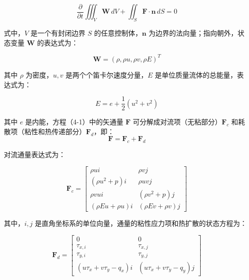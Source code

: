 \begin{equation}
\frac{\partial}{\partial t} \iiint_V \mathbf{W} \, dV + \iint_S \mathbf{F} \cdot \mathbf{n} \, dS = 0 
\end{equation}

式中，\(V\) 是一个有封闭边界 \(S\) 的任意控制体，\(\mathbf{n}\) 为边界的法向量；指向朝外，状态变量 \(\mathbf{W}\) 的表达式为：

\begin{equation}
\mathbf{W} = (\rho, \rho u, \rho v, \rho E)^T 
\end{equation}

其中 \(\rho\) 为密度，\(u, v\) 是两个个笛卡尔速度分量，\(E\) 是单位质量流体的总能量，表达式为：

\begin{equation}
E = e + \frac{1}{2}(u^2 + v^2) 
\end{equation}

其中 \(e\) 是内能，方程（4-1）中的矢通量 \(\mathbf{F}\) 可分解成对流项（无粘部分）\(\mathbf{F}_c\) 和耗散项（粘性和热传递部分）\(\mathbf{F}_d\)，即：
\begin{equation}
\mathbf{F} = \mathbf{F}_c + \mathbf{F}_d 
\end{equation}

对流通量表达式为：

\begin{equation}
\mathbf{F}_c = 
\begin{bmatrix}
\rho u i & \rho v j \\
(\rho u^2 + p) i & \rho u v j \\
\rho v u i & (\rho v^2 + p) j \\
(\rho E u + \rho u) i & (\rho E v + \rho v) j
\end{bmatrix} 
\end{equation}

其中，\(i, j\) 是直角坐标系的单位向量，通量的粘性应力项和热扩散的状态方程为：

\begin{equation}
\mathbf{F}_d = 
\begin{bmatrix}
0 & 0 \\
\tau_{x,i} & \tau_{x,j} \\
\tau_{y,i} & \tau_{y,j} \\
(u \tau_x + v \tau_y - q_x) i & (u \tau_x + v \tau_y - q_y) j
\end{bmatrix} 
\end{equation}

